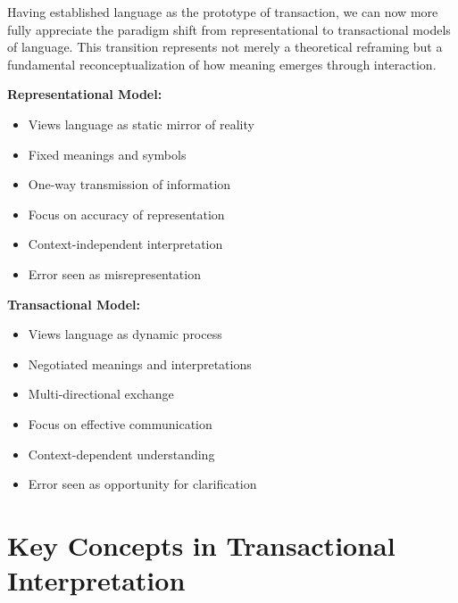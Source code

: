 \documentclass[12pt]{article}
\begin{document}
Having established language as the prototype of transaction, we can now more fully appreciate the paradigm shift from representational to transactional models of language. This transition represents not merely a theoretical reframing but a fundamental reconceptualization of how meaning emerges through interaction.

\begin{tcolorbox}[featurebox, title=Models Comparison]
\textbf{Representational Model:}
\begin{itemize}
\item Views language as static mirror of reality
\item Fixed meanings and symbols
\item One-way transmission of information
\item Focus on accuracy of representation
\item Context-independent interpretation
\item Error seen as misrepresentation
\end{itemize}

\textbf{Transactional Model:}
\begin{itemize}
\item Views language as dynamic process
\item Negotiated meanings and interpretations
\item Multi-directional exchange
\item Focus on effective communication
\item Context-dependent understanding
\item Error seen as opportunity for clarification
\end{itemize}
\end{tcolorbox}

\section{Key Concepts in Transactional Interpretation}
\end{document}
